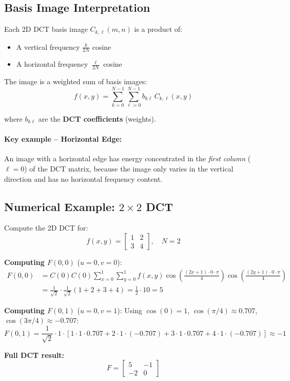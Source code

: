 \documentclass[12pt,a4paper]{article}
\begin{document}
\subsection{Basis Image Interpretation}

Each 2D DCT basis image $C_{k,\ell}(m,n)$ is a product of:
\begin{itemize}
  \item A vertical frequency $\frac{k}{2N}$ cosine
  \item A horizontal frequency $\frac{\ell}{2N}$ cosine
\end{itemize}

The image is a weighted sum of basis images:
\[
  f(x,y) = \sum_{k=0}^{N-1}\sum_{\ell=0}^{N-1}b_{k\ell}\,C_{k,\ell}(x,y)
\]

where $b_{k\ell}$ are the \textbf{DCT coefficients} (weights).

\paragraph{Key example -- Horizontal Edge:}
An image with a horizontal edge has energy concentrated in the \emph{first column} ($\ell=0$) of the DCT matrix, because the image only varies in the vertical direction and has no horizontal frequency content.

\subsection{Numerical Example: $2\times 2$ DCT}

\begin{examplebox}
Compute the 2D DCT for:
\[
  f(x,y) = \begin{bmatrix} 1 & 2\\ 3 & 4 \end{bmatrix},
  \quad N = 2
\]

\textbf{Computing $F(0,0)$} ($u=0, v=0$):
\begin{align*}
  F(0,0)
  &= C(0)C(0)\sum_{x=0}^{1}\sum_{y=0}^{1}f(x,y)
    \cos\!\left(\frac{(2x+1)\cdot0\cdot\pi}{4}\right)
    \cos\!\left(\frac{(2y+1)\cdot0\cdot\pi}{4}\right)\\
  &= \frac{1}{\sqrt{2}}\cdot\frac{1}{\sqrt{2}}(1+2+3+4) = \frac{1}{2}\cdot10 = 5
\end{align*}

\textbf{Computing $F(0,1)$} ($u=0, v=1$):
Using $\cos(0)=1$, $\cos(\pi/4) \approx 0.707$, $\cos(3\pi/4) \approx -0.707$:
\[
  F(0,1) = \frac{1}{\sqrt{2}}\cdot 1\cdot
  \left[1\cdot1\cdot0.707 + 2\cdot1\cdot(-0.707) + 3\cdot1\cdot0.707 + 4\cdot1\cdot(-0.707)\right]
  \approx -1
\]

\textbf{Full DCT result:}
\[
  F = \begin{bmatrix} 5 & -1\\ -2 & 0 \end{bmatrix}
\]
\end{examplebox}
\end{document}

